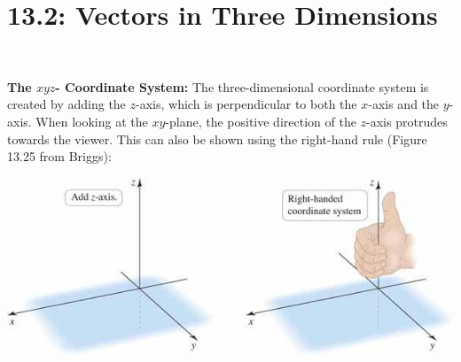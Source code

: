 \documentclass[mathNotesPreamble]{subfiles}
\begin{document}
\section{13.2: Vectors in Three Dimensions}~

  \textbf{The $xyz$- Coordinate System:}\newline
    The three-dimensional coordinate system is created by adding the $z$-axis, which is perpendicular to both the $x$-axis and the $y$-axis. When looking at the $xy$-plane, the positive direction of the $z$-axis protrudes towards the viewer. This can also be shown using the right-hand rule (Figure 13.25 from Briggs):
    \begin{center}
      \includegraphics[width=0.7\linewidth]{images/briggs_13_02/fig13_25}
    \end{center}
\end{document}
